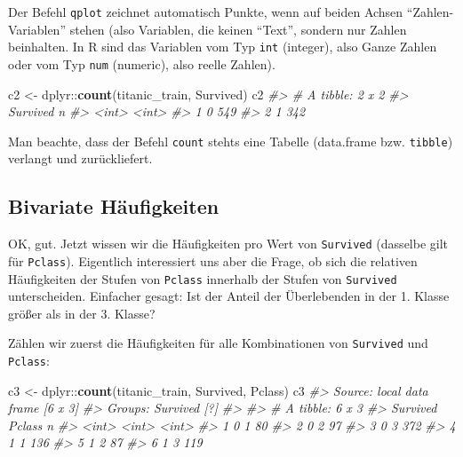 \documentclass[12pt,ngerman,]{book}
\makeatletter
\newenvironment{Shaded}{\begin{snugshade}}{\end{snugshade}}
\newcommand{\KeywordTok}[1]{\textcolor[rgb]{0.13,0.29,0.53}{\textbf{{#1}}}}
\newcommand{\StringTok}[1]{\textcolor[rgb]{0.31,0.60,0.02}{{#1}}}
\newcommand{\CommentTok}[1]{\textcolor[rgb]{0.56,0.35,0.01}{\textit{{#1}}}}
\newcommand{\NormalTok}[1]{{#1}}
\newenvironment{kframe}{%
\medskip{}
\setlength{\fboxsep}{.8em}
 \def\at@end@of@kframe{}%
 \ifinner\ifhmode%
  \def\at@end@of@kframe{\end{minipage}}%
  \begin{minipage}{\columnwidth}%
 \fi\fi%
 \def\FrameCommand##1{\hskip\@totalleftmargin \hskip-\fboxsep
 \colorbox{shadecolor}{##1}\hskip-\fboxsep
     \hskip-\linewidth \hskip-\@totalleftmargin \hskip\columnwidth}%
 \MakeFramed {\advance\hsize-\width
   \@totalleftmargin\z@ \linewidth\hsize
   \@setminipage}}%
 {\par\unskip\endMakeFramed%
 \at@end@of@kframe}
\renewenvironment{Shaded}{\begin{kframe}}{\end{kframe}}
\theoremstyle{definition}
\theoremstyle{definition}
\theoremstyle{remark}
\makeatother
\begin{document}
Der Befehl \texttt{qplot} zeichnet automatisch Punkte, wenn auf beiden
Achsen ``Zahlen-Variablen'' stehen (also Variablen, die keinen ``Text'',
sondern nur Zahlen beinhalten. In R sind das Variablen vom Typ
\texttt{int} (integer), also Ganze Zahlen oder vom Typ \texttt{num}
(numeric), also reelle Zahlen).

\begin{Shaded}
\begin{Highlighting}[]

\NormalTok{c2 <-}\StringTok{ }\NormalTok{dplyr::}\KeywordTok{count}\NormalTok{(titanic_train, Survived)}
\NormalTok{c2}
\CommentTok{#> # A tibble: 2 x 2}
\CommentTok{#>   Survived     n}
\CommentTok{#>      <int> <int>}
\CommentTok{#> 1        0   549}
\CommentTok{#> 2        1   342}
\end{Highlighting}
\end{Shaded}

Man beachte, dass der Befehl \texttt{count} stehts eine Tabelle
(data.frame bzw. \texttt{tibble}) verlangt und zurückliefert.

\subsection{Bivariate Häufigkeiten}\label{bivariate-haufigkeiten}

OK, gut. Jetzt wissen wir die Häufigkeiten pro Wert von
\texttt{Survived} (dasselbe gilt für \texttt{Pclass}). Eigentlich
interessiert uns aber die Frage, ob sich die relativen Häufigkeiten der
Stufen von \texttt{Pclass} innerhalb der Stufen von \texttt{Survived}
unterscheiden. Einfacher gesagt: Ist der Anteil der Überlebenden in der
1. Klasse größer als in der 3. Klasse?

Zählen wir zuerst die Häufigkeiten für alle Kombinationen von
\texttt{Survived} und \texttt{Pclass}:

\begin{Shaded}
\begin{Highlighting}[]
\NormalTok{c3 <-}\StringTok{ }\NormalTok{dplyr::}\KeywordTok{count}\NormalTok{(titanic_train, Survived, Pclass)}
\NormalTok{c3}
\CommentTok{#> Source: local data frame [6 x 3]}
\CommentTok{#> Groups: Survived [?]}
\CommentTok{#> }
\CommentTok{#> # A tibble: 6 x 3}
\CommentTok{#>   Survived Pclass     n}
\CommentTok{#>      <int>  <int> <int>}
\CommentTok{#> 1        0      1    80}
\CommentTok{#> 2        0      2    97}
\CommentTok{#> 3        0      3   372}
\CommentTok{#> 4        1      1   136}
\CommentTok{#> 5        1      2    87}
\CommentTok{#> 6        1      3   119}
\end{Highlighting}
\end{Shaded}
\end{document}
